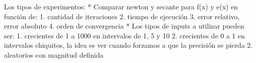 

Los tipos de experimentos:
* Comparar newton y secante para f(x) y e(x) en función de:
    1. cantidad de iteraciones
    2. tiempo de ejecución
    3. error relativo, error absoluto
    4. orden de convergencia
* Los tipos de inputs a utilizar pueden ser:
    1. crecientes de 1 a 1000 en intervalos de 1, 5 y 10
    2. crecientes de 0 a 1 en intervalos chiquitos, la idea es ver cuando forzamos a que la precisión se pierda
    2. aleatorios con magnitud definida